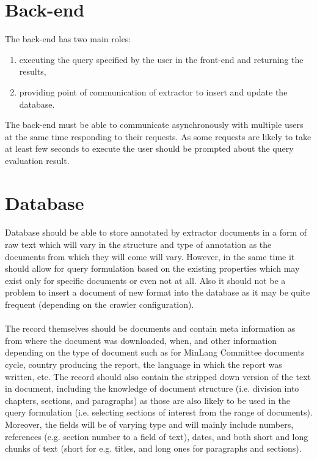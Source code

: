 \documentclass[a4paper]{tufte-book}
\begin{document}
\section{Back-end}
The back-end has two main roles:
\begin{enumerate}
  \item executing the query specified by the user in the front-end and returning the results,
  \item providing point of communication of extractor to insert and update the database.
\end{enumerate}
The back-end must be able to communicate asynchronously with multiple users at the same time responding to their requests. As some requests are likely to take at least few seconds to execute the user should be prompted about the query evaluation result.

\section{Database}
\paragraph{}
Database should be able to store annotated by extractor documents in a form of raw text which will vary in the structure and type of annotation as the documents from which they will come will vary. However, in the same time it should allow for query formulation based on the existing properties which may exist only for specific documents or even not at all. Also it should not be a problem to insert a document of new format into the database as it may be quite frequent (depending on the crawler configuration).

\paragraph{}
The record themselves should be documents and contain meta information as from where the document was downloaded, when, and other information depending on the type of document such as for MinLang Committee documents cycle, country producing the report, the language in which the report was written, etc. The record should also contain the stripped down version of the text in document, including the knowledge of document structure (i.e. division into chapters, sections, and paragraphs) as those are also likely to be used in the query formulation (i.e. selecting sections of interest from the range of documents). Moreover, the fields will be of varying type and will mainly include numbers, references (e.g. section number to a field of text), dates, and both short and long chunks of text (short for e.g. titles, and long ones for paragraphs and sections).
\end{document}

